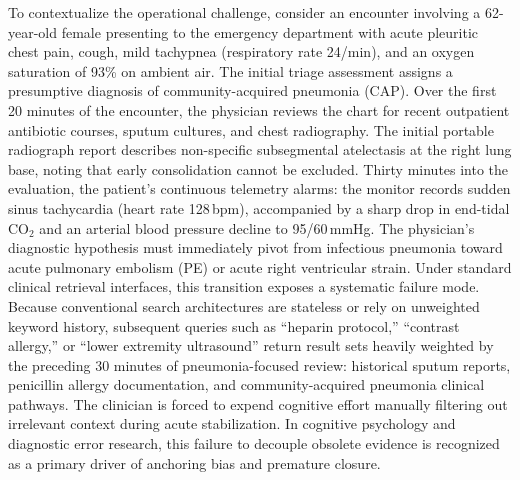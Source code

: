 \documentclass[12pt]{article}
\begin{document}
To contextualize the operational challenge, consider an encounter involving a 62-year-old female presenting to the emergency department with acute pleuritic chest pain, cough, mild tachypnea (respiratory rate 24/min), and an oxygen saturation of 93\% on ambient air. The initial triage assessment assigns a presumptive diagnosis of community-acquired pneumonia (CAP). Over the first 20 minutes of the encounter, the physician reviews the chart for recent outpatient antibiotic courses, sputum cultures, and chest radiography. The initial portable radiograph report describes non-specific subsegmental atelectasis at the right lung base, noting that early consolidation cannot be excluded. Thirty minutes into the evaluation, the patient's continuous telemetry alarms: the monitor records sudden sinus tachycardia (heart rate 128\,bpm), accompanied by a sharp drop in end-tidal $\text{CO}_2$ and an arterial blood pressure decline to 95/60\,mmHg. The physician's diagnostic hypothesis must immediately pivot from infectious pneumonia toward acute pulmonary embolism (PE) or acute right ventricular strain. Under standard clinical retrieval interfaces, this transition exposes a systematic failure mode. Because conventional search architectures are stateless or rely on unweighted keyword history, subsequent queries such as ``heparin protocol,'' ``contrast allergy,'' or ``lower extremity ultrasound'' return result sets heavily weighted by the preceding 30 minutes of pneumonia-focused review: historical sputum reports, penicillin allergy documentation, and community-acquired pneumonia clinical pathways. The clinician is forced to expend cognitive effort manually filtering out irrelevant context during acute stabilization. In cognitive psychology and diagnostic error research, this failure to decouple obsolete evidence is recognized as a primary driver of anchoring bias and premature closure\cite{croskerry2002achieving,goddard2012automation}.
\end{document}
